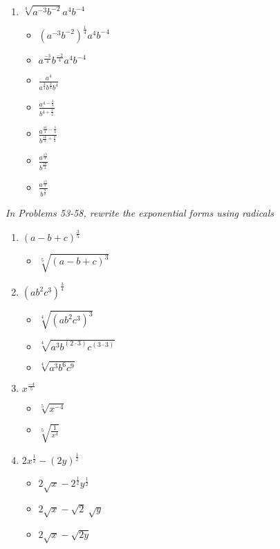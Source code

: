 \documentclass{article}
\begin{document}
\begin{onehalfspace}
\begin{enumerate}[start=41]
        \item $\sqrt[4]{a^{-3}b^{-2}}a^{4}b^{-4}$
        \begin{itemize}
            \item $\left( a^{-3}b^{-2} \right)^{\frac{1}{4}}a^{4}b^{-4}$
            \item $a^{\frac{-3}{4}}b^{\frac{-2}{4}}a^{4}b^{-4}$
            \item $\frac{a^{4}}{a^{\frac{3}{4}}b^{\frac{2}{4}} b^{4}}$
            \item $\frac{a^{4 - \frac{3}{4}}}{b^{4 + \frac{2}{4}}}$
            \item $\frac{a^{\frac{16}{4} - \frac{3}{4}}}{b^{\frac{16}{4} + \frac{2}{4}}}$
            \item $\frac{a^{\frac{13}{4}}}{b^{\frac{18}{4}}}$
            \item $\frac{a^{\frac{13}{4}}}{b^{\frac{9}{2}}}$
        \end{itemize}
     \end{enumerate}
     \par

     \textit{In Problems 53-58, rewrite the exponential forms using radicals}
     \begin{enumerate}[start=53]
        \item $\left( a - b + c \right)^{\frac{3}{5}}$
        \begin{itemize}
            \item $\sqrt[5]{(a - b + c)^{3}}$
        \end{itemize}

        \item $\left( ab^{2}c^{3} \right)^{\frac{3}{4}}$
        \begin{itemize}
            \item $\sqrt[4]{(ab^{2}c^{3})^{3}}$
            \item $\sqrt[4]{a^{3} b^{(2 \cdot 3)} c^{(3 \cdot 3)}}$
            \item $\sqrt[4]{a^{3} b^{6} c^{9}}$
        \end{itemize}

        \item $x^{\frac{-4}{5}}$
        \begin{itemize}
            \item $\sqrt[5]{x^{-4}}$
            \item $\sqrt[5]{\frac{1}{x^{4}}}$
        \end{itemize}

        \item $2x^{\frac{1}{2}} - (2y)^{\frac{1}{2}}$
        \begin{itemize}
            \item $2 \sqrt{x} - 2^{\frac{1}{2}} y^{\frac{1}{2}}$
            \item $2 \sqrt{x} - \sqrt{2} \ \sqrt{y}$
            \item $2 \sqrt{x} - \sqrt{2y}$
        \end{itemize}


\end{enumerate}
\end{onehalfspace}
\end{document}

